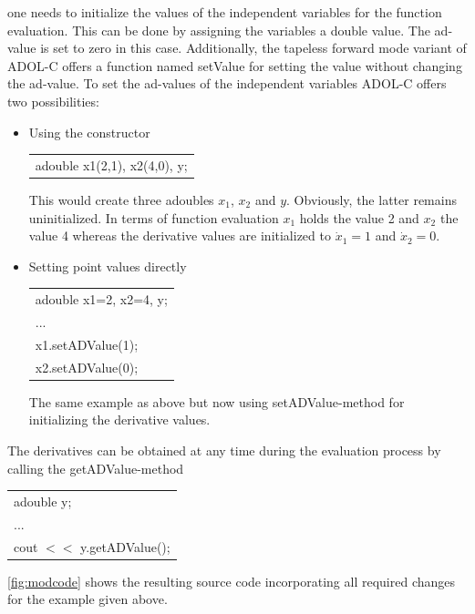 \documentclass[11pt,twoside]{article}
\begin{document}
one needs to initialize the values of the independent variables for the
function evaluation. This can be done by assigning the variables a {\sf
double} value. The {\sf ad}-value is set to zero in this case. 
Additionally, the tapeless forward mode variant of ADOL-C
offers a function named {\sf setValue} for setting the value without
changing the {\sf ad}-value. To set the {\sf ad}-values of the independent
variables ADOL-C offers two possibilities: 
\begin{itemize}
  \item Using the constructor
        \begin{center}
	  \begin{tabular}{l}
	    {\sf adouble x1(2,1), x2(4,0), y;}
	  \end{tabular}
	\end{center}
	This would create three adoubles $x_1$, $x_2$ and $y$. Obviously, the latter
	remains uninitialized. In terms of function evaluation
	$x_1$ holds the value 2 and $x_2$ the value 4 whereas the derivative values
	are initialized to $\dot{x}_1=1$ and $\dot{x}_2=0$.
   \item Setting point values directly
         \begin{center}
	   \begin{tabular}{l}
	     {\sf adouble x1=2, x2=4, y;}\\
	     ...\\
	     {\sf x1.setADValue(1);}\\
	     {\sf x2.setADValue(0);}
	   \end{tabular}
	 \end{center}
	 The same example as above but now using {\sf setADValue}-method for initializing the derivative values.
\end{itemize}
%
The derivatives can be obtained at any time during the evaluation
process by calling the {\sf getADValue}-method
\begin{center}
  \begin{tabular}{l}
    {\sf adouble y;}\\
    ...\\
    {\sf cout $<<$ y.getADValue();}
  \end{tabular}
\end{center}
\autoref{fig:modcode} shows the resulting source code incorporating
all required changes for the example
given above.
\end{document}
